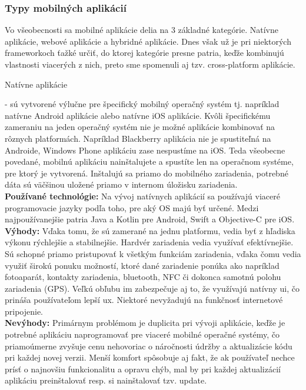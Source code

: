 \subsubsection{Typy mobilných aplikácií}
\label{sec:typy aplikacii}
Vo všeobecnosti sa mobilné aplikácie delia na 3 základné kategórie. Natívne aplikácie, webové aplikácie a hybridné aplikácie. Dnes však už je pri niektorých frameworkoch ťažké určiť, do ktorej kategórie presne patria, keďže kombinujú vlastnosti viacerých z nich, preto sme spomenuli aj tzv. cross-platform aplikácie.
\begin{itemize}[leftmargin=*]
{\bf \item Natívne aplikácie} - sú vytvorené výlučne pre špecifický mobilný operačný systém tj. napríklad natívne Android aplikácie alebo natívne iOS aplikácie. Kvôli špecifickému zameraniu na jeden operačný systém nie je možné aplikácie kombinovať na rôznych platformách. Napríklad Blackberry aplikácia nie je spustiteľná na Androide, Windows Phone aplikáciu zase nespustíme na iOS. Teda všeobecne povedané, mobilnú aplikáciu nainštalujete a spustíte len na operačnom systéme, pre ktorý je vytvorená. Inštalujú sa priamo do mobilného zariadenia, potrebné dáta sú väčšinou uložené priamo v internom úložisku zariadenia. \\

{\bf Používané technológie:} Na vývoj natívnych aplikácií sa používajú viaceré programovacie jazyky podľa toho, pre aký OS majú byť určené. Medzi najpoužívanejšie patria Java a Kotlin pre Android, Swift a Objective-C pre iOS. \\

{\bf Výhody:} Vďaka tomu, že sú zamerané na jednu platformu, vedia byť z hľadiska výkonu rýchlejšie a stabilnejšie. Hardvér zariadenia vedia využívať efektívnejšie. Sú schopné priamo pristupovať k všetkým funkciám zariadenia, vďaka čomu vedia využiť širokú ponuku možností, ktoré dané zariadenie ponúka ako napríklad fotoaparát, kontakty zariadenia, bluetooth, NFC či dokonca samotnú polohu zariadenia (GPS). Veľkú obľubu im zabezpečuje aj to, že využívajú natívny \acrshort{ui}, čo prináša používateľom lepší \acrshort{ux}. Niektoré nevyžadujú na funkčnosť internetové pripojenie. \\
 
{\bf Nevýhody:}  Primárnym problémom je duplicita pri vývoji aplikácie, keďže je potrebné aplikáciu naprogramovať pre viaceré mobilné operačné systémy, čo priamoúmerne zvyšuje cenu nehovoriac o náročnosti údržby a aktualizácie kódu pri každej novej verzii. Menší komfort spôsobuje aj fakt, že ak používateľ nechce prísť o najnovšiu funkcionalitu a opravu chýb, mal by pri každej aktualizácií aplikáciu preinštalovať resp. si nainštalovať tzv. update. \\


\end{itemize}

